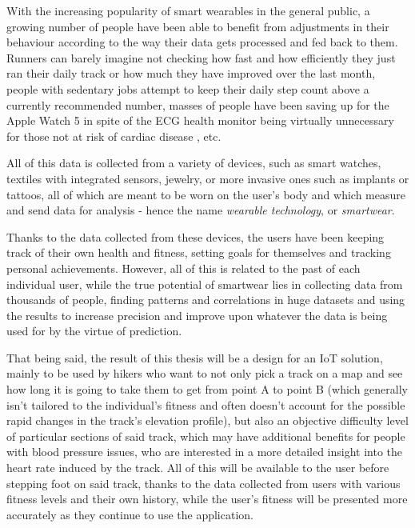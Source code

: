 \linebreak
With the increasing popularity of smart wearables in the general public, a growing number of people have been able to benefit from adjustments in their behaviour according to the way their data gets processed and fed back to them.
Runners can barely imagine not checking how fast and how efficiently they just ran their daily track or how much they have improved over the last month,
people with sedentary jobs attempt to keep their daily step count above a currently recommended number,
masses of people have been saving up for the Apple Watch 5 \cite{AppleWatch5} in spite of the ECG health monitor being virtually unnecessary for those not at risk of cardiac disease \cite{ecg-screening}, etc.

All of this data is collected from a variety of devices, such as smart watches, textiles with integrated sensors, jewelry, or more invasive ones such as implants or tattoos, all of which are meant to be worn on the user's body and which measure and send data for analysis - hence the name \textit{wearable technology}, or \textit{smartwear}. \cite{what-is-wearable-tech}

Thanks to the data collected from these devices, the users have been keeping track of their own health and fitness, setting goals for themselves and tracking personal achievements.
However, all of this is related to the past of each individual user, while the true potential of smartwear lies in collecting data from thousands of people,
finding patterns and correlations in huge datasets and using the results to increase precision and improve upon whatever the data is being used for by the virtue of prediction.

That being said, the result of this thesis will be a design for an IoT solution, mainly to be used by hikers who want to not only pick a track on a map and see how long it is going to take them to get from point A to point B (which generally isn't tailored to the individual's fitness and often doesn't account for the possible rapid changes in the track's elevation profile),
but also an objective difficulty level of particular sections of said track, which may have additional benefits for people with blood pressure issues, who are interested in a more detailed insight into the heart rate induced by the track.
All of this will be available to the user before stepping foot on said track, thanks to the data collected from users with various fitness levels and their own history,
while the user's fitness will be presented more accurately as they continue to use the application.

